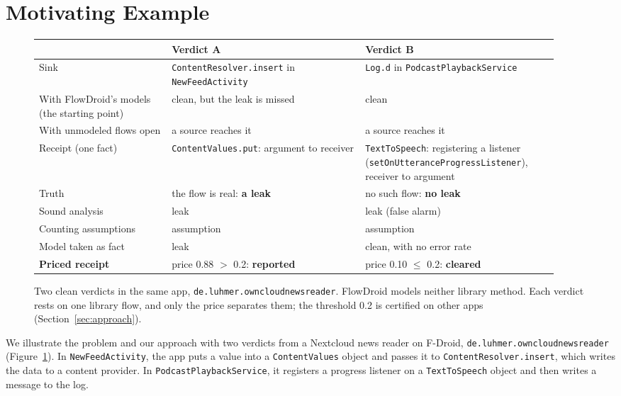 \section{Motivating Example}
\label{sec:example}

\begin{figure}[t]
\small
\begin{tabular}{@{}>{\raggedright\arraybackslash}p{0.24\linewidth}>{\raggedright\arraybackslash}p{0.35\linewidth}>{\raggedright\arraybackslash}p{0.35\linewidth}@{}}
\toprule
 & \textbf{Verdict A} & \textbf{Verdict B}\\
\midrule
Sink & \texttt{ContentResolver.insert} in \texttt{NewFeedActivity} & \texttt{Log.d} in \texttt{PodcastPlaybackService}\\
With FlowDroid's models (the starting point) & clean, but the leak is missed & clean\\
With unmodeled flows open & a source reaches it & a source reaches it\\
Receipt (one fact) & \texttt{ContentValues.put}: argument to receiver & \texttt{TextToSpeech}: registering a listener (\texttt{setOnUtterance}\allowbreak\texttt{ProgressListener}), receiver to argument\\
Truth & the flow is real: \textbf{a leak} & no such flow: \textbf{no leak}\\
\midrule
Sound analysis & leak & leak (false alarm)\\
Counting assumptions & 1 assumption & 1 assumption\\
Model taken as fact & leak & clean, with no error rate\\
\textbf{Priced receipt} & price 0.88 $>$ 0.2: \textbf{reported} & price 0.10 $\le$ 0.2: \textbf{cleared}\\
\bottomrule
\end{tabular}
\caption{Two clean verdicts in the same app, \texttt{de.luhmer.}\allowbreak\texttt{owncloudnewsreader}. FlowDroid models neither library method. Each verdict rests on one library flow, and only the price separates them; the threshold 0.2 is certified on other apps (Section~\ref{sec:approach}).}
\label{fig:example}
\end{figure}

We illustrate the problem and our approach with two verdicts from a Nextcloud news reader on F-Droid, \texttt{de.luhmer.}\allowbreak\texttt{owncloudnewsreader} (Figure~\ref{fig:example}).
In \texttt{NewFeedActivity}, the app puts a value into a \texttt{ContentValues} object and passes it to \texttt{ContentResolver.insert}, which writes the data to a content provider.
In \texttt{PodcastPlaybackService}, it registers a progress listener on a \texttt{TextToSpeech} object and then writes a message to the log.

